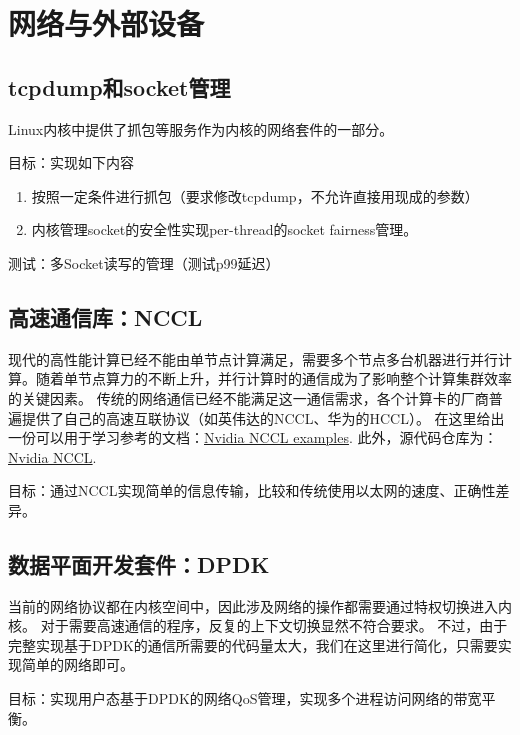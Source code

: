 \chapter{网络与外部设备}
\section{tcpdump和socket管理}
Linux内核中提供了抓包等服务作为内核的网络套件的一部分。

目标：实现如下内容
\begin{enumerate}
    \item 按照一定条件进行抓包（要求修改tcpdump，不允许直接用现成的参数）
    \item 内核管理socket的安全性实现per-thread的socket fairness管理。
\end{enumerate}

测试：多Socket读写的管理（测试p99延迟）

\section{高速通信库：NCCL}
现代的高性能计算已经不能由单节点计算满足，需要多个节点多台机器进行并行计算。随着单节点算力的不断上升，并行计算时的通信成为了影响整个计算集群效率的关键因素。
传统的网络通信已经不能满足这一通信需求，各个计算卡的厂商普遍提供了自己的高速互联协议（如英伟达的NCCL、华为的HCCL）。
在这里给出一份可以用于学习参考的文档：\href{https://docs.nvidia.com/deeplearning/nccl/user-guide/docs/examples.html#communicator-creation-and-destruction-examples}{Nvidia NCCL examples}.
此外，源代码仓库为：\href{https://github.com/NVIDIA/nccl}{Nvidia NCCL}.

目标：通过NCCL实现简单的信息传输，比较和传统使用以太网的速度、正确性差异。



\section{数据平面开发套件：DPDK}
当前的网络协议都在内核空间中，因此涉及网络的操作都需要通过特权切换进入内核。
对于需要高速通信的程序，反复的上下文切换显然不符合要求。
不过，由于完整实现基于DPDK的通信所需要的代码量太大，我们在这里进行简化，只需要实现简单的网络即可。

目标：实现用户态基于DPDK的网络QoS管理，实现多个进程访问网络的带宽平衡。